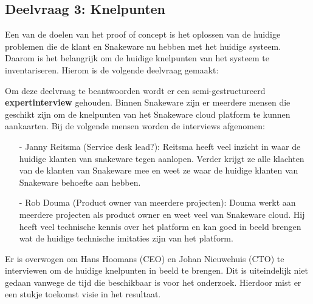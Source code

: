 \subsection{Deelvraag 3: Knelpunten}
Een van de doelen van het proof of concept is het oplossen van de huidige problemen die de klant en Snakeware nu hebben met het huidige systeem.
Daarom is het belangrijk om de huidige knelpunten van het systeem te inventariseren.
Hierom is de volgende deelvraag gemaakt:

%
%
\begin{center}
    \textit{\SubquestionThree}
\end{center}

\whitespace[0.2]
Om deze deelvraag te beantwoorden wordt er een semi-gestructureerd \textbf{expertinterview} gehouden.
Binnen Snakeware zijn er meerdere mensen die geschikt zijn om de knelpunten van het Snakeware cloud platform te kunnen aankaarten.
Bij de volgende mensen worden de interviews afgenomen:
\begin{itemize}
    \item[-] Janny Reitsma (Service desk lead?): Reitsma heeft veel inzicht in waar de huidige klanten van snakeware tegen aanlopen.
        Verder krijgt ze alle klachten van de klanten van Snakeware mee en weet ze waar de huidige klanten van Snakeware behoefte aan hebben.
    \item[-] Rob Douma (Product owner van meerdere projecten): Douma werkt aan meerdere projecten als product owner en weet veel van Snakeware cloud.
        Hij heeft veel technische kennis over het platform en kan goed in beeld brengen wat de huidige technische imitaties zijn van het platform.
\end{itemize}

\whitespace
Er is overwogen om Hans Hoomans (CEO) en Johan Nieuwehuis (CTO) te interviewen om de huidige knelpunten in beeld te brengen.
Dit is uiteindelijk niet gedaan vanwege de tijd die beschikbaar is voor het onderzoek.
Hierdoor mist er een stukje toekomst visie in het resultaat.
